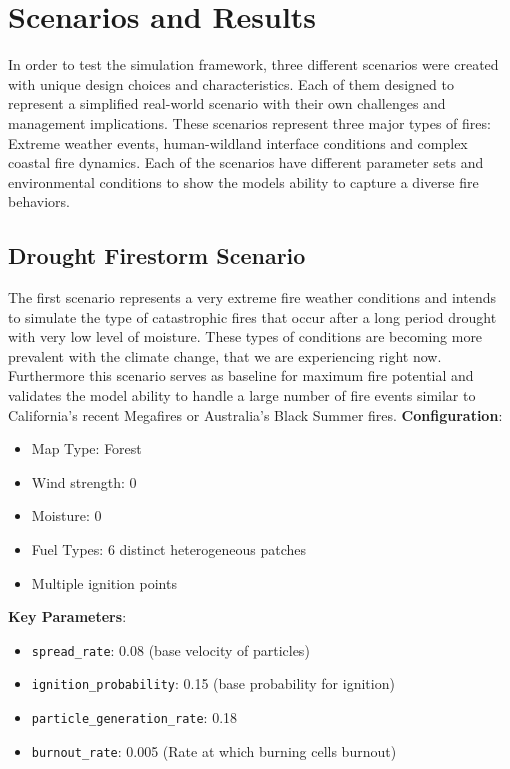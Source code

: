 \section{Scenarios and Results}
In order to test the simulation framework, three different scenarios were created with unique design choices and characteristics. Each of them designed to represent a simplified real-world scenario with their own challenges and management implications. These scenarios represent three major types of fires: Extreme weather events, human-wildland interface conditions and complex coastal fire dynamics. Each of the scenarios have different parameter sets and environmental conditions to show the models ability to capture a diverse fire behaviors.

\subsection{Drought Firestorm Scenario}
The first scenario represents a very extreme fire weather conditions and intends to simulate the type of catastrophic fires that occur after a long period drought with very low level of moisture. These types of conditions are becoming more prevalent with the climate change, that we are experiencing right now. Furthermore this scenario serves as baseline for maximum fire potential and validates the model ability to handle a large number of fire events similar to California's recent Megafires or Australia's Black Summer fires.\newline
\newline
\textbf{Configuration}:
\begin{itemize}
	\item Map Type: Forest
	\item Wind strength: 0
	\item Moisture: 0
	\item Fuel Types: 6 distinct heterogeneous patches
	\item Multiple ignition points
\end{itemize}
\textbf{Key Parameters}:
\begin{itemize}
	\item \texttt{spread\_rate}: 0.08 (base velocity of particles)
	\item \texttt{ignition\_probability}: 0.15 (base probability for ignition)
	\item \texttt{particle\_generation\_rate}: 0.18
	\item \texttt{burnout\_rate}: 0.005 (Rate at which burning cells burnout)
\end{itemize}


